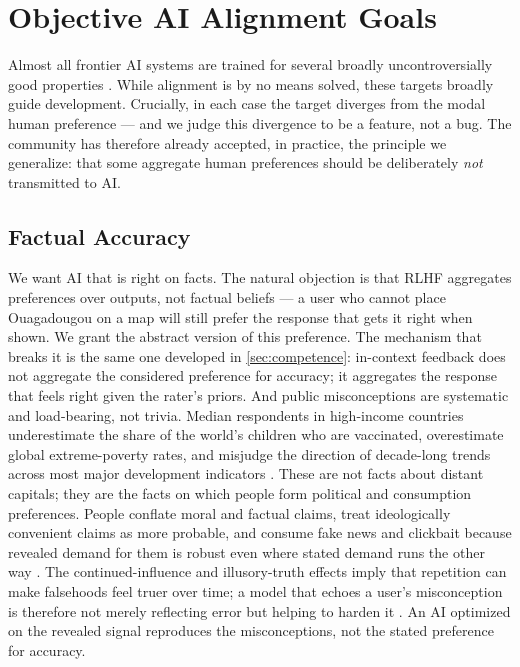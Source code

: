 \documentclass{article}
\theoremstyle{plain}
\theoremstyle{definition}
\theoremstyle{remark}
\begin{document}
\section{Objective AI Alignment Goals}
\label{sec:objective}

Almost all frontier AI systems are trained for several broadly uncontroversially good properties \citep{askell2021general, bai2022constitutional}. While alignment is by no means solved, these targets broadly guide development. Crucially, in each case the target diverges from the modal human preference --- and we judge this divergence to be a feature, not a bug. The community has therefore already accepted, in practice, the principle we generalize: that some aggregate human preferences should be deliberately \emph{not} transmitted to AI.

\subsection{Factual Accuracy}
We want AI that is right on facts. The natural objection is that RLHF aggregates preferences over outputs, not factual beliefs --- a user who cannot place Ouagadougou on a map will still prefer the response that gets it right when shown. We grant the abstract version of this preference. The mechanism that breaks it is the same one developed in \cref{sec:competence}: in-context feedback does not aggregate the considered preference for accuracy; it aggregates the response that feels right given the rater's priors. And public misconceptions are systematic and load-bearing, not trivia. Median respondents in high-income countries underestimate the share of the world's children who are vaccinated, overestimate global extreme-poverty rates, and misjudge the direction of decade-long trends across most major development indicators \citep{sdg-misconceptions}. These are not facts about distant capitals; they are the facts on which people form political and consumption preferences. People conflate moral and factual claims, treat ideologically convenient claims as more probable, and consume fake news and clickbait because revealed demand for them is robust even where stated demand runs the other way \citep{lewandowsky2012misinformation}. The continued-influence and illusory-truth effects imply that repetition can make falsehoods feel truer over time; a model that echoes a user's misconception is therefore not merely reflecting error but helping to harden it \citep{lewandowsky2012misinformation}. An AI optimized on the revealed signal reproduces the misconceptions, not the stated preference for accuracy.
\end{document}

